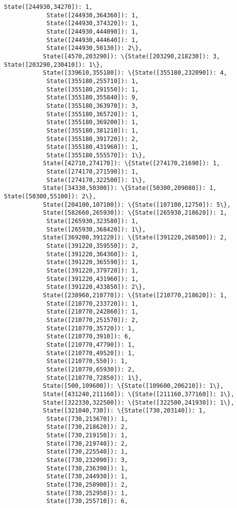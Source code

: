 \documentclass[11pt]{article}
\begin{document}
\begin{Verbatim}[commandchars=\\\{\}]
            State([244930,34270]): 1,
            State([244930,364360]): 1,
            State([244930,374320]): 1,
            State([244930,444090]): 1,
            State([244930,444640]): 1,
            State([244930,50130]): 2\},
           State([4570,203290]): \{State([203290,218230]): 3, State([203290,230410]): 1\},
           State([339610,355180]): \{State([355180,232090]): 4,
            State([355180,255710]): 1,
            State([355180,291550]): 1,
            State([355180,355840]): 9,
            State([355180,363970]): 3,
            State([355180,365720]): 1,
            State([355180,369200]): 1,
            State([355180,381210]): 1,
            State([355180,391720]): 2,
            State([355180,431960]): 1,
            State([355180,555570]): 1\},
           State([42710,274170]): \{State([274170,21690]): 1,
            State([274170,271590]): 1,
            State([274170,322500]): 1\},
           State([34330,50300]): \{State([50300,209080]): 1, State([50300,55100]): 2\},
           State([204100,107100]): \{State([107100,12750]): 5\},
           State([582660,265930]): \{State([265930,218620]): 1,
            State([265930,323580]): 1,
            State([265930,368420]): 1\},
           State([369200,391220]): \{State([391220,268500]): 2,
            State([391220,359550]): 2,
            State([391220,364360]): 1,
            State([391220,365590]): 1,
            State([391220,379720]): 1,
            State([391220,431960]): 1,
            State([391220,433850]): 2\},
           State([238960,210770]): \{State([210770,218620]): 1,
            State([210770,233720]): 1,
            State([210770,242860]): 1,
            State([210770,251570]): 2,
            State([210770,35720]): 1,
            State([210770,3910]): 6,
            State([210770,47790]): 1,
            State([210770,49520]): 1,
            State([210770,550]): 1,
            State([210770,65930]): 2,
            State([210770,72850]): 1\},
           State([500,109600]): \{State([109600,206210]): 1\},
           State([431240,211160]): \{State([211160,377160]): 1\},
           State([322330,322500]): \{State([322500,241930]): 1\},
           State([321040,730]): \{State([730,203140]): 1,
            State([730,213670]): 1,
            State([730,218620]): 2,
            State([730,219150]): 1,
            State([730,219740]): 2,
            State([730,225540]): 1,
            State([730,232090]): 3,
            State([730,236390]): 1,
            State([730,244930]): 1,
            State([730,250900]): 2,
            State([730,252950]): 1,
            State([730,255710]): 6,

\end{Verbatim}
\end{document}
